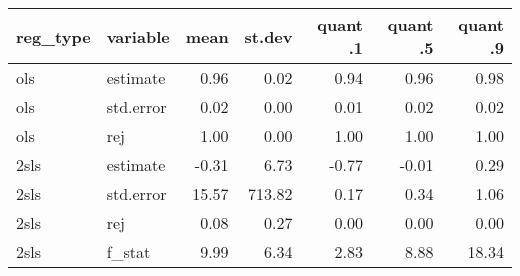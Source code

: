 \begin{tabular}{llrrrrr}
  \hline
reg\_type & variable & mean & st.dev & quant .1 & quant .5 & quant .9 \\ 
  \hline
ols & estimate & 0.96 & 0.02 & 0.94 & 0.96 & 0.98 \\ 
  ols & std.error & 0.02 & 0.00 & 0.01 & 0.02 & 0.02 \\ 
  ols & rej & 1.00 & 0.00 & 1.00 & 1.00 & 1.00 \\ 
  2sls & estimate & -0.31 & 6.73 & -0.77 & -0.01 & 0.29 \\ 
  2sls & std.error & 15.57 & 713.82 & 0.17 & 0.34 & 1.06 \\ 
  2sls & rej & 0.08 & 0.27 & 0.00 & 0.00 & 0.00 \\ 
  2sls & f\_stat & 9.99 & 6.34 & 2.83 & 8.88 & 18.34 \\ 
   \hline
\end{tabular}
